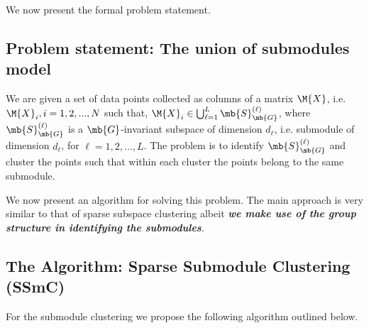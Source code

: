 \documentclass[conference]{IEEEtran}
\begin{document}
 

We now present the formal problem statement.

\subsection{Problem statement: The union of submodules model} 

We are given a set of data points collected as columns of a matrix $\M{X}$, i.e. $\M{X}_{i}, i = 1,2,...,N$ such that, $\M{X}_i \in \bigcup_{\ell =1}^{L} \mb{S}_{\mb{G}}^{(\ell)}$, where $\mb{S}_{\mb{G}}^{(\ell)}$ is a $\mb{G}$-invariant subspace of dimension $d_\ell$, i.e. submodule of dimension $d_\ell$, for $\ell = 1,2,...,L$. The problem is to identify $\mb{S}_{\mb{G}}^{(\ell)}$ and cluster the points such that within each cluster the points belong to the same submodule.


We now present an algorithm for solving this problem. The main approach is very similar to that of sparse subspace clustering albeit \emph{\textbf{we make use of the group structure in identifying the submodules}}.


\subsection{The Algorithm: Sparse Submodule Clustering (SSmC)}
\label{sec:alg}

For the submodule clustering we propose the following algorithm outlined below. 
\end{document}
